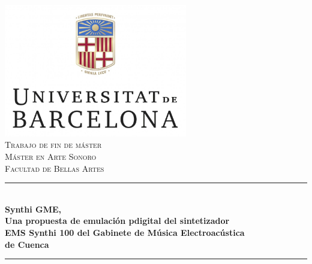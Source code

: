 \begin{titlepage}

\newcommand{\HRule}{\rule{\linewidth}{0.5mm}} %

\center %


\includegraphics[width=0.6\textwidth]{./portada/logoUB}\\[1cm] %
 

\textsc{\LARGE Trabajo de fin de máster}\\[1cm] %
\textsc{\Large Máster en Arte Sonoro}\\[0.5cm] %
\textsc{\large Facultad de Bellas Artes}\\[0.5cm] %


\HRule \\[0.4cm]
{ \large \bfseries  Synthi GME,\\ \normalsize Una propuesta de emulación pdigital del sintetizador\\ EMS Synthi 100 del Gabinete de Música Electroacústica\\de Cuenca}\\[0.4cm] %
\HRule \\[0.5cm]
 

\end{titlepage}
